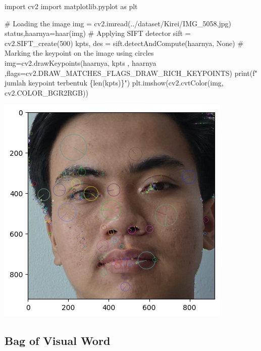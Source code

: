 \documentclass[
  letterpaper,
  DIV=11,
  numbers=noendperiod]{scrreprt}
\newenvironment{Shaded}{\begin{snugshade}}{\end{snugshade}}
\newcommand{\BuiltInTok}[1]{\textcolor[rgb]{0.00,0.23,0.31}{#1}}
\newcommand{\CommentTok}[1]{\textcolor[rgb]{0.37,0.37,0.37}{#1}}
\newcommand{\DecValTok}[1]{\textcolor[rgb]{0.68,0.00,0.00}{#1}}
\newcommand{\ImportTok}[1]{\textcolor[rgb]{0.00,0.46,0.62}{#1}}
\newcommand{\NormalTok}[1]{\textcolor[rgb]{0.00,0.23,0.31}{#1}}
\newcommand{\OperatorTok}[1]{\textcolor[rgb]{0.37,0.37,0.37}{#1}}
\newcommand{\SpecialCharTok}[1]{\textcolor[rgb]{0.37,0.37,0.37}{#1}}
\newcommand{\SpecialStringTok}[1]{\textcolor[rgb]{0.13,0.47,0.30}{#1}}
\newcommand{\StringTok}[1]{\textcolor[rgb]{0.13,0.47,0.30}{#1}}
\newcommand{\VariableTok}[1]{\textcolor[rgb]{0.07,0.07,0.07}{#1}}
\begin{document}
\begin{Shaded}
\begin{Highlighting}[]
\ImportTok{import}\NormalTok{ cv2}
\ImportTok{import}\NormalTok{ matplotlib.pyplot }\ImportTok{as}\NormalTok{ plt}

\CommentTok{\# Loading the image}
\NormalTok{img }\OperatorTok{=}\NormalTok{ cv2.imread(}\StringTok{\textquotesingle{}../dataset/Kirei/IMG\_5058.jpg\textquotesingle{}}\NormalTok{)}
\NormalTok{status,haarnya}\OperatorTok{=}\NormalTok{haar(img)}
\CommentTok{\# Applying SIFT detector}
\NormalTok{sift }\OperatorTok{=}\NormalTok{ cv2.SIFT\_create(}\DecValTok{500}\NormalTok{)}
\NormalTok{kpts, des }\OperatorTok{=}\NormalTok{ sift.detectAndCompute(haarnya, }\VariableTok{None}\NormalTok{)}
\CommentTok{\# Marking the keypoint on the image using circles}
\NormalTok{img}\OperatorTok{=}\NormalTok{cv2.drawKeypoints(haarnya, kpts , haarnya ,flags}\OperatorTok{=}\NormalTok{cv2.DRAW\_MATCHES\_FLAGS\_DRAW\_RICH\_KEYPOINTS)}
\BuiltInTok{print}\NormalTok{(}\SpecialStringTok{f" jumlah keypoint terbentuk }\SpecialCharTok{\{}\BuiltInTok{len}\NormalTok{(kpts)}\SpecialCharTok{\}}\SpecialStringTok{"}\NormalTok{)}
\NormalTok{plt.imshow(cv2.cvtColor(img, cv2.COLOR\_BGR2RGB))}
\end{Highlighting}
\end{Shaded}

\includegraphics{Asset/sift.png}

\hypertarget{bag-of-visual-word}{%
\subsection*{Bag of Visual Word}\label{bag-of-visual-word}}
\end{document}
